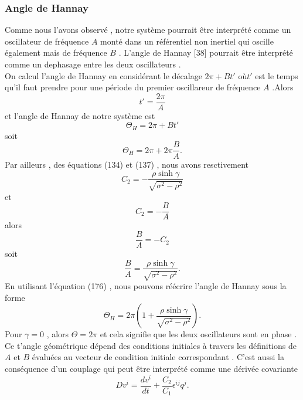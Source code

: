 \documentclass[12pt,a4paper, openany]{article}
\begin{document}
		 	\subsubsection{Angle de Hannay}
		 	Comme nous l'avons observé , notre système pourrait \^{e}tre interprété comme un oscillateur de fréquence $A$ monté dans un référentiel non inertiel qui oscille également mais de fréquence $B$ . L'angle de Hannay [38] pourrait \^{e}tre interprété comme un dephasage entre les deux 
		 	 oscillateurs .\\
		 	  On calcul l'angle de Hannay en considérant le décalage $2\pi+Bt'$ où$ t'$ est le temps qu'il  faut prendre  pour une période du premier oscillareur de fréquence $A$ .Alors 
		 	  \begin{equation}
		 	  	t'=\frac{2\pi}{A}
		 	  \end{equation}
		 	  et l'angle de Hannay de notre système est 
		 	  \begin{equation}
		 	  	\varTheta_H=2\pi+Bt'
		 	  \end{equation}
		 	  soit 
		 	  \begin{equation}
		 	  \varTheta_H=2\pi+2\pi\frac{B}{A}.	
		 	  \end{equation}
		 Par ailleurs , des équations (134) et (137) , nous avons resctivement
		 $$ C_2=-\frac{\rho\sinh{\gamma}}{\sqrt{\sigma^2-\rho^2}}$$
		 et \\
		 $$C_2=-\frac{B}{A}$$
		 alors 
		 \begin{equation}
		 	\frac{B}{A}= -C_2
		 \end{equation}
		 soit
		 \begin{equation}
		 	\frac{B}{A}=\frac{\rho\sinh{\gamma}}{\sqrt{\sigma^2-\rho^2}}. 
		 \end{equation}
		 En utilisant l'équation (176) , nous pouvons réécrire l'angle de Hannay sous la forme 
		 \begin{equation}
		 \varTheta_H=2\pi\left(1+\frac{\rho\sinh{\gamma}}{\sqrt{\sigma^2-\rho^2}}\right).	
		 \end{equation}
		 Pour $\gamma=0$ , alors $\varTheta=2\pi$ et cela signifie que les deux oscillateurs sont en phase . Ce t'angle géométrique dépend des conditions initiales à travers les définitions de $A$ et $B$ évaluées au vecteur de condition initiale correspondant . C'est aussi la conséquence d'un couplage qui peut \^{e}tre interprété comme une dérivée covariante 
		 \begin{equation}
		  Dv^i=\frac{dv^i}{dt}+\frac{C_2}{C_1}\epsilon^{ij}	q^j.
		 \end{equation}
\end{document}
